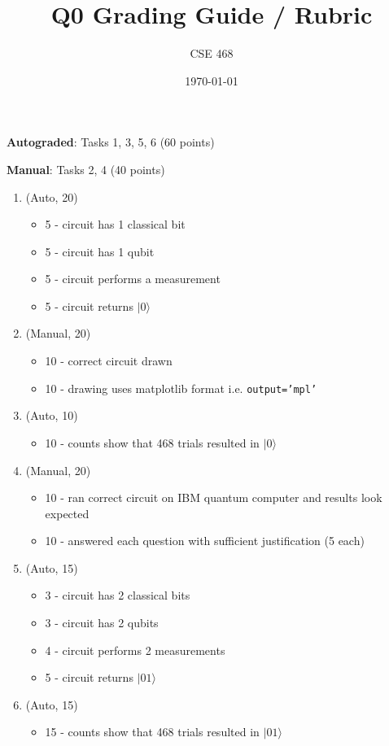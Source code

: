 \documentclass[12pt]{article}
\title{Q0 Grading Guide / Rubric}
\author{CSE 468}
\date{\today}
\begin{document}
\maketitle

\noindent \textbf{Autograded}: Tasks 1, 3, 5, 6 (60 points) 

\noindent \textbf{Manual}: Tasks 2, 4 (40 points)

\begin{enumerate}[font=\bfseries]
    \item (Auto, 20) 
    \begin{itemize}
        \item 5 - circuit has 1 classical bit
        \item 5 - circuit has 1 qubit
        \item 5 - circuit performs a measurement
        \item 5 - circuit returns $|0\rangle$
    \end{itemize}
    \item (Manual, 20)
    \begin{itemize}
        \item 10 - correct circuit drawn
        \item 10 - drawing uses matplotlib format i.e. \texttt{output='mpl'}
    \end{itemize}
    \item (Auto, 10) 
    \begin{itemize}
        \item 10 - counts show that 468 trials resulted in $|0\rangle$
    \end{itemize}
    \item (Manual, 20)
    \begin{itemize}
        \item 10 - ran correct circuit on IBM quantum computer and results look expected
        \item 10 - answered each question with sufficient justification (5 each)
    \end{itemize}
    \item (Auto, 15) 
    \begin{itemize}
        \item 3 - circuit has 2 classical bits
        \item 3 - circuit has 2 qubits
        \item 4 - circuit performs 2 measurements
        \item 5 - circuit returns $|01\rangle$
    \end{itemize}
    \item (Auto, 15) 
    \begin{itemize}
        \item 15 - counts show that 468 trials resulted in $|01\rangle$
    \end{itemize}
\end{enumerate}
\end{document}
